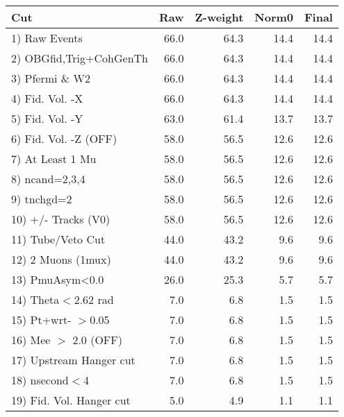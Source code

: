  \begin{table}[h!]\centering
 \begin{tabular}{||l||r|r|r|r||}
 \hline
 \hline
 Cut & Raw & Z-weight & Norm0 & Final \\
 \hline
  1) Raw Events           &        66.0 &        64.3 &        14.4 &        14.4 \\
  2) OBGfid,Trig+CohGenTh &        66.0 &        64.3 &        14.4 &        14.4 \\
  3) Pfermi \& W2         &        66.0 &        64.3 &        14.4 &        14.4 \\
  4) Fid. Vol. -X         &        66.0 &        64.3 &        14.4 &        14.4 \\
  5) Fid. Vol. -Y         &        63.0 &        61.4 &        13.7 &        13.7 \\
  6) Fid. Vol. -Z (OFF)   &        58.0 &        56.5 &        12.6 &        12.6 \\
  7) At Least 1 Mu        &        58.0 &        56.5 &        12.6 &        12.6 \\
  8) ncand=2,3,4          &        58.0 &        56.5 &        12.6 &        12.6 \\
  9) tnchgd=2             &        58.0 &        56.5 &        12.6 &        12.6 \\
 10) +/- Tracks (V0)      &        58.0 &        56.5 &        12.6 &        12.6 \\
 11) Tube/Veto Cut        &        44.0 &        43.2 &         9.6 &         9.6 \\
 12) 2 Muons (1mux)       &        44.0 &        43.2 &         9.6 &         9.6 \\
 13) PmuAsym<0.0          &        26.0 &        25.3 &         5.7 &         5.7 \\
 14) Theta$<$2.62 rad     &         7.0 &         6.8 &         1.5 &         1.5 \\
 15) Pt+wrt- $>$0.05      &         7.0 &         6.8 &         1.5 &         1.5 \\
 16) Mee $>$ 2.0  (OFF)   &         7.0 &         6.8 &         1.5 &         1.5 \\
 17) Upstream Hanger cut  &         7.0 &         6.8 &         1.5 &         1.5 \\
 18) nsecond$<$4          &         7.0 &         6.8 &         1.5 &         1.5 \\
 19) Fid. Vol. Hanger cut &         5.0 &         4.9 &         1.1 &         1.1 \\

\end{tabular}
\end{table}

